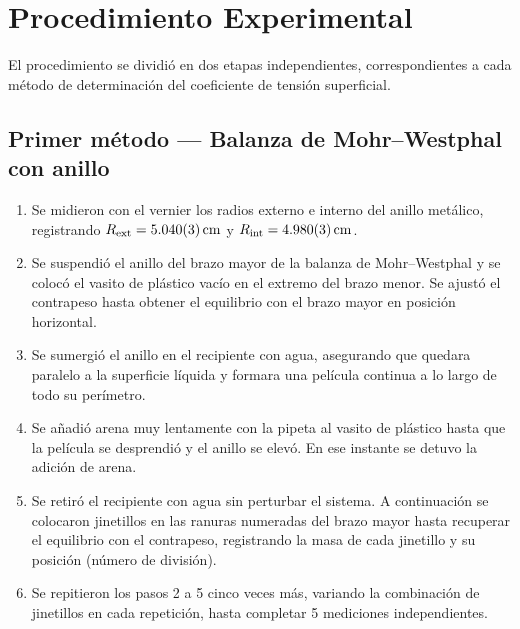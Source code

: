 
\section{Procedimiento Experimental}

El procedimiento se dividió en dos etapas independientes, correspondientes
a cada método de determinación del coeficiente de tensión superficial.

\subsection{Primer método — Balanza de Mohr--Westphal con anillo}

\begin{enumerate}
    \item Se midieron con el vernier los radios externo e interno del anillo
    metálico, registrando $R_{\text{ext}} = \qty{5.04 \pm 0.003}{cm}$ y
    $R_{\text{int}} = \qty{4.98 \pm 0.003}{cm}$.

    \item Se suspendió el anillo del brazo mayor de la balanza de
    Mohr--Westphal y se colocó el vasito de plástico vacío en el extremo
    del brazo menor. Se ajustó el contrapeso hasta obtener el equilibrio
    con el brazo mayor en posición horizontal.

    \item Se sumergió el anillo en el recipiente con agua, asegurando que
    quedara paralelo a la superficie líquida y formara una película
    continua a lo largo de todo su perímetro.

    \item Se añadió arena muy lentamente con la pipeta al vasito de
    plástico hasta que la película se desprendió y el anillo se elevó.
    En ese instante se detuvo la adición de arena.

    \item Se retiró el recipiente con agua sin perturbar el sistema.
    A continuación se colocaron jinetillos en las ranuras numeradas del
    brazo mayor hasta recuperar el equilibrio con el contrapeso,
    registrando la masa de cada jinetillo y su posición (número de
    división).

    \item Se repitieron los pasos 2 a 5 cinco veces más, variando la
    combinación de jinetillos en cada repetición, hasta completar 5
    mediciones independientes.
\end{enumerate}


